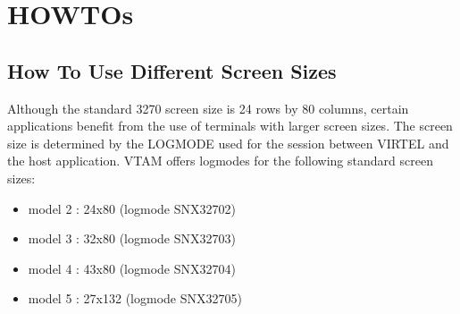\documentclass[letterpaper,10pt,english]{sphinxmanual}
\begin{document}
\begin{sphinxVerbatim}[commandchars=\\\{\}]
                                             
                                    

                                                
                                           
\end{sphinxVerbatim}



\chapter{HOWTOs}
\label{\detokenize{User_Guide:howtos}}

\section{How To Use Different Screen Sizes}
\label{\detokenize{User_Guide:how-to-use-different-screen-sizes}}
Although the standard 3270 screen size is 24 rows by 80 columns, certain applications benefit from the use of
terminals with larger screen sizes. The screen size is determined by the LOGMODE used for the session between
VIRTEL and the host application. VTAM offers logmodes for the following standard screen sizes:
\begin{itemize}
\item {} 
model 2 : 24x80 (logmode SNX32702)

\item {} 
model 3 : 32x80 (logmode SNX32703)

\item {} 
model 4 : 43x80 (logmode SNX32704)

\item {} 
model 5 : 27x132 (logmode SNX32705)

\end{itemize}
\end{document}
